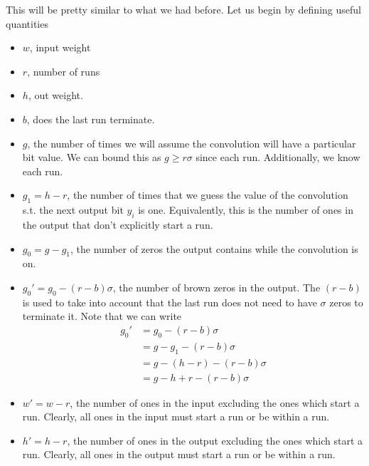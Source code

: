 This will be pretty similar to what we had before. Let us begin by defining useful quantities
\begin{itemize}
    \item $w$, input weight
    \item $r$, number of runs
    \item $h$, out weight. 
    \item $b$, does the last run terminate.
    \item $g$, the number of times we will assume the convolution will have a particular bit value. We can bound this as $g\geq r\sigma$ since each run. Additionally, we know each run.
    \item $g_1=h-r$, the number of times that we guess the value of the convolution s.t. the next output bit $y_i$ is one. Equivalently, this is the number of ones in the output that don't explicitly start a run. %
    \item $g_0=g-g_1$, the number of zeros the output contains while the convolution is on. %
    \item $g_0'=g_0 - (r-b)\sigma$, the number of brown zeros in the output. The $(r-b)$ is used to take into account that the last run does not need to have $\sigma$ zeros to terminate it. 
    Note that we can write 
    \begin{align*}
        g_0'&=g_0 - (r-b)\sigma\\
        &=g-g_1- (r-b)\sigma\\
        &=g-(h-r)- (r-b)\sigma\\
        &=g-h+r-(r-b)\sigma
    \end{align*}
    \item $w'=w-r$, the number of ones in the input excluding the ones which start a run. Clearly, all ones in the input must start a run or be within a run.
    \item $h'=h-r$, the number of ones in the output excluding the ones which start a run. Clearly, all ones in the output must start a run or be within a run.
\end{itemize}

